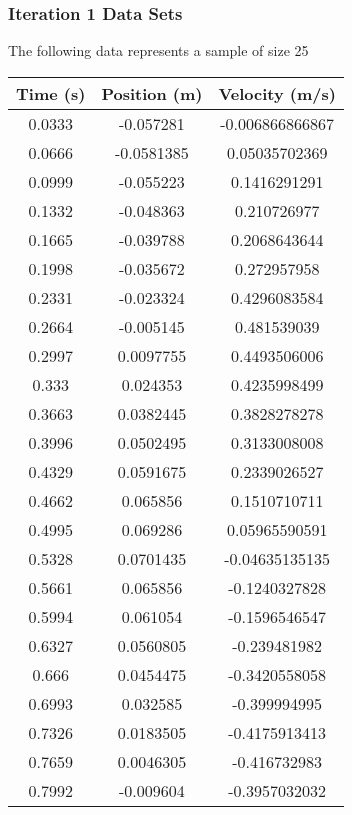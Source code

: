 \documentclass{report}
\begin{document}
    \subsubsection{Iteration 1 Data Sets}
    \bigbreak \noindent 
    The following data represents a sample of size 25
    \bigbreak \noindent 
        \begin{center}
            \begin{tabular}{c|c|c}
                Time (s) & Position (m) & Velocity (m/s)\\
                \hline
                0.0333&	-0.057281&	-0.006866866867\\
                0.0666&	-0.0581385	&0.05035702369\\
                0.0999&	-0.055223&	0.1416291291\\
                0.1332&	-0.048363&	0.210726977\\
                0.1665&	-0.039788&	0.2068643644\\
                0.1998&	-0.035672&	0.272957958\\
                0.2331&	-0.023324&	0.4296083584\\
                0.2664&	-0.005145&	0.481539039\\
                0.2997&	0.0097755&	0.4493506006\\
                0.333 &  0.024353 &   0.4235998499\\
                0.3663&	0.0382445&	0.3828278278\\
                0.3996&	0.0502495&	0.3133008008\\
                0.4329&	0.0591675&	0.2339026527\\
                0.4662&	0.065856 &   0.1510710711\\
                0.4995&	0.069286 &   0.05965590591\\
                0.5328&	0.0701435&	-0.04635135135\\
                0.5661&	0.065856 &   -0.1240327828\\
                0.5994&	0.061054 &   -0.1596546547\\
                0.6327&	0.0560805&	-0.239481982\\
                0.666 &  0.0454475&	-0.3420558058\\
                0.6993&	0.032585 &   -0.399994995\\
                0.7326&	0.0183505&	-0.4175913413\\
                0.7659&	0.0046305&	-0.416732983\\
                0.7992&	-0.009604&	-0.3957032032\\
            \end{tabular}
        \end{center}
\end{document}
